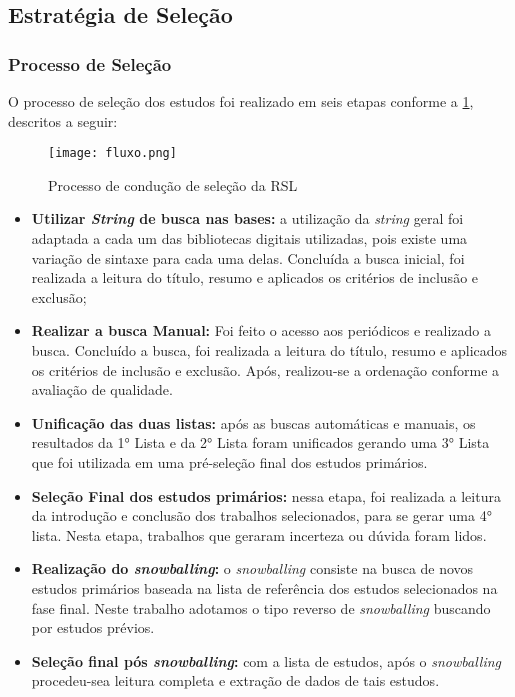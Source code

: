 \newpage
\subsection{Estratégia de Seleção}

\subsubsection{Processo de Seleção}
O processo de seleção dos estudos foi realizado em seis etapas conforme a \ref{fig:selecao}, descritos a seguir:
\begin{figure}[htb]
	\centering
	\caption{Processo de condução de seleção da RSL}
	\texttt{[image: fluxo.png]}
	\label{fig:selecao}
\end{figure}

\begin{itemize}
	\item \textbf{Utilizar \textit{String} de busca nas bases:} a utilização da \textit{string} geral foi adaptada a cada um das bibliotecas digitais utilizadas, pois existe uma variação de sintaxe para cada uma delas. Concluída a busca inicial, foi realizada a leitura do título, resumo e aplicados os critérios de inclusão e exclusão;
	
	\item \textbf{Realizar a busca Manual:} Foi feito o acesso aos periódicos e realizado a busca. Concluído a busca, foi realizada a leitura do título, resumo e aplicados os critérios de inclusão e exclusão. Após, realizou-se a ordenação conforme a avaliação de qualidade. 
	
	\item \textbf{Unificação das duas listas:} após as buscas automáticas e manuais, os resultados da 1° Lista e da 2° Lista foram unificados gerando uma 3° Lista que foi utilizada em uma pré-seleção final dos estudos primários.
	
	\item \textbf{Seleção Final dos estudos primários:} nessa etapa, foi realizada a leitura da introdução e conclusão dos trabalhos selecionados, para se gerar uma 4° lista. Nesta etapa, trabalhos que geraram incerteza ou dúvida foram lidos.
	
	\item \textbf{Realização do \textit{snowballing}:} o \textit{snowballing} consiste na busca de novos estudos primários baseada na lista de referência dos estudos selecionados na fase final. Neste trabalho adotamos o tipo reverso de \textit{snowballing} buscando por estudos prévios.
	
	\item \textbf{Seleção final pós \textit{snowballing}:} com a lista de estudos, após o \textit{snowballing} procedeu-sea leitura completa e extração de dados de tais estudos.
\end{itemize}

